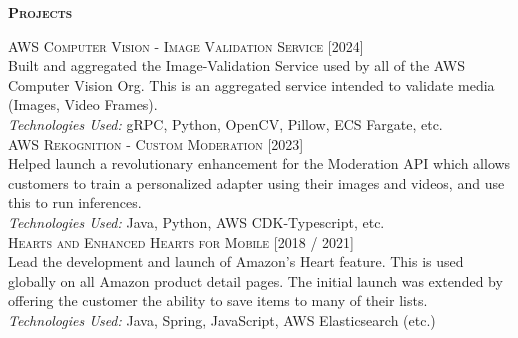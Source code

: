 \documentclass[letterpaper,12pt,final]{memoir}
\newcommand{\Sep}{\vspace{1.5em}}
\newcommand{\SmallSep}{\vspace{0.5em}}
\newcommand{\CVSection}[1]
	{\Large\textbf{\textsc{{#1}}}\par
	\SmallSep\normalsize\normalfont}
\newcommand{\CVItem}[1]
	{\textsc{\color{Plum} #1}}
\newcommand{\RightAlignedInlineText}[1]
{{\footnotesize \color{Plum}  \hfill [#1]}}
\begin{document}
\CVSection{Projects}
\CVItem{AWS Computer Vision - Image Validation Service} \RightAlignedInlineText{2024}\\
{\footnotesize Built and aggregated the Image-Validation Service used by all of the AWS Computer Vision Org. This is an aggregated service intended to validate media (Images, Video Frames). \\\color{Black}
	\emph{Technologies Used:} gRPC, Python, OpenCV, Pillow, ECS Fargate, etc.}%
\SmallSep\\
\CVItem{AWS Rekognition - Custom Moderation}  \RightAlignedInlineText{2023}\\
{\footnotesize Helped launch a revolutionary enhancement for the Moderation API which allows customers to train a personalized adapter using their images and videos, and use this to run inferences.\\
	\emph{Technologies Used:} Java, Python, AWS CDK-Typescript, etc. }%
\SmallSep\\
\CVItem{Hearts and Enhanced Hearts for Mobile} \RightAlignedInlineText{2018 / 2021}\\
{\footnotesize Lead the development and launch of Amazon's Heart feature. This is used globally  on all Amazon product detail pages. The initial launch was extended by offering the customer the ability to save items to many of their lists.\\\color{Black}
\emph{Technologies Used:} Java, Spring, JavaScript, AWS Elasticsearch (etc.)}%
\SmallSep\\
\end{document}
